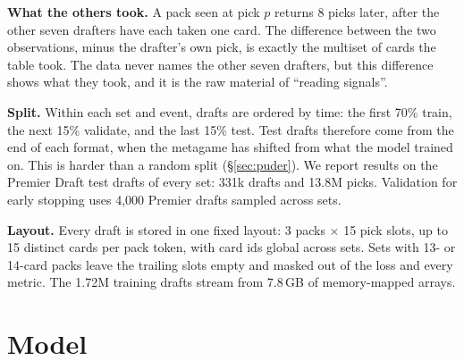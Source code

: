 \documentclass[10pt,letterpaper]{article}
\begin{document}
\textbf{What the others took.} A pack seen at pick $p$ returns 8 picks later, after the other seven
drafters have each taken one card. The difference between the two observations, minus the drafter's own
pick, is exactly the multiset of cards the table took. The data never names the other seven drafters, but this
difference shows what they took, and it is the raw material of ``reading signals''.

\textbf{Split.} Within each set and event, drafts are ordered by time: the first 70\% train, the next 15\%
validate, and the last 15\% test. Test drafts therefore come from the end of each format, when the
metagame has shifted from what the model trained on. This is harder than a random split (\S\ref{sec:puder}). We
report results on the Premier Draft test drafts of every set: 331k drafts and 13.8M picks. Validation for early
stopping uses 4,000 Premier drafts sampled across sets.

\textbf{Layout.} Every draft is stored in one fixed layout: 3 packs $\times$ 15 pick slots, up to 15 distinct
cards per pack token, with card ids global across sets. Sets with 13- or 14-card packs leave the trailing
slots empty and masked out of the loss and every metric. The 1.72M training drafts stream from 7.8\,GB of
memory-mapped arrays.

\section{Model}\label{sec:model}
\end{document}
